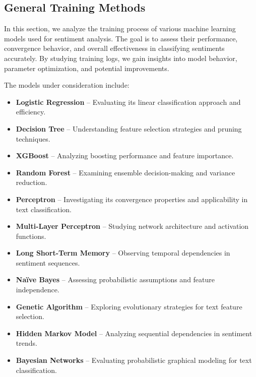 \subsection{General Training Methods}

In this section, we analyze the training process of various machine learning models used for sentiment analysis. The goal is to assess their performance, convergence behavior, and overall effectiveness in classifying sentiments accurately. By studying training logs, we gain insights into model behavior, parameter optimization, and potential improvements.

The models under consideration include:
\begin{itemize}
    \item \textbf{Logistic Regression} – Evaluating its linear classification approach and efficiency.
    \item \textbf{Decision Tree} – Understanding feature selection strategies and pruning techniques.
    \item \textbf{XGBoost} – Analyzing boosting performance and feature importance.
    \item \textbf{Random Forest} – Examining ensemble decision-making and variance reduction.
    \item \textbf{Perceptron} – Investigating its convergence properties and applicability in text classification.
    \item \textbf{Multi-Layer Perceptron} – Studying network architecture and activation functions.
    \item \textbf{Long Short-Term Memory} – Observing temporal dependencies in sentiment sequences.
    \item \textbf{Naïve Bayes} – Assessing probabilistic assumptions and feature independence.
    \item \textbf{Genetic Algorithm} – Exploring evolutionary strategies for text feature selection.
    \item \textbf{Hidden Markov Model} – Analyzing sequential dependencies in sentiment trends.
    \item \textbf{Bayesian Networks} – Evaluating probabilistic graphical modeling for text classification.
\end{itemize}

